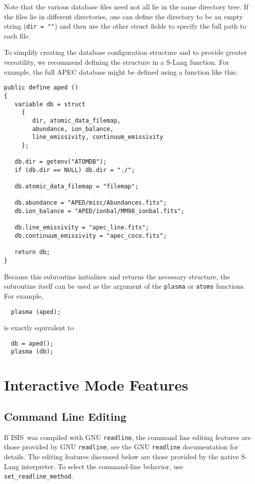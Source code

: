 \documentclass{book}
\newcommand{\isisx}{{\sc ISIS~}}
\begin{document}
{Note that the various database files need not all lie in the same
directory tree. If the files lie in different directories, one can
define the directory to be an empty string ({\tt dir = ""}) and
then use the other struct fields to specify the full path to each
file.

To simplify creating the database configuration structure and to
provide greater versatility, we recommend defining the structure
in a S-Lang function.  For example, the full APEC database might
be defined using a function like this:
\begin{verbatim}
public define aped ()
{
   variable db = struct
     {
        dir, atomic_data_filemap,
        abundance, ion_balance,
        line_emissivity, continuum_emissivity
     };

   db.dir = getenv("ATOMDB");
   if (db.dir == NULL) db.dir = "./";

   db.atomic_data_filemap = "filemap";

   db.abundance = "APED/misc/Abundances.fits";
   db.ion_balance = "APED/ionbal/MM98_ionbal.fits";

   db.line_emissivity = "apec_line.fits";
   db.continuum_emissivity = "apec_coco.fits";

   return db;
}
\end{verbatim}
Because this subroutine initializes and returns the necessary
structure, the subroutine itself can be used as the argument
of the {\tt plasma} or {\tt atoms} functions.  For example,
\begin{verbatim}
  plasma (aped);
\end{verbatim}
is exactly equivalent to
\begin{verbatim}
  db = aped();
  plasma (db);
\end{verbatim}

\chapter{Interactive Mode Features}
\label{chap:interactive}

\section{Command Line Editing}

If \isisx was compiled with GNU \verb|readline|, the command
line editing features are those provided by GNU
\verb|readline|; see the GNU \verb|readline| documentation for
details.  The editing features discussed below are those
provided by the native S-Lang interpreter.  To select the
command-line behavior, use \verb|set_readline_method|.

}
\end{document}
